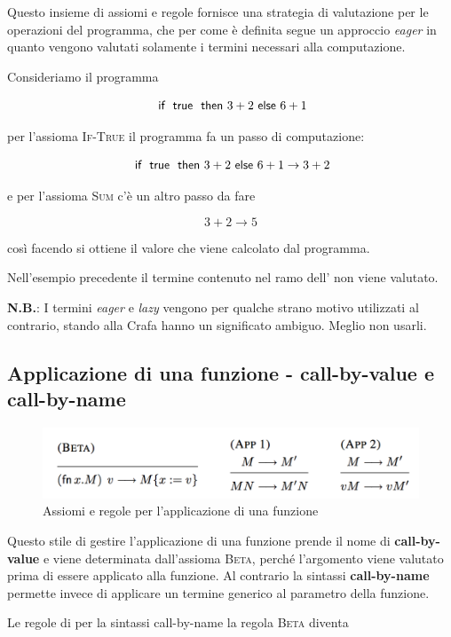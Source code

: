 Questo insieme di assiomi e regole fornisce una strategia di valutazione per le operazioni del programma, che per come è definita segue un approccio \textit{eager}  in quanto vengono valutati solamente i termini necessari alla computazione.

Consideriamo il programma 

$$
\iif \true \then 3+2 \eelse 6+1
$$

\noindent per l'assioma \textsc{If-True} il programma fa un passo di computazione:

$$
\iif \true \then 3+2 \eelse 6+1 \rightarrow 3+2
$$

\noindent e per l'assioma \textsc{Sum} c'è un altro passo da fare

$$
3+2 \rightarrow 5
$$

\noindent così facendo si ottiene il valore che viene calcolato dal programma.

Nell'esempio precedente il termine contenuto nel ramo  dell' non viene valutato.

\textbf{N.B.}: I termini \textit{eager} e \textit{lazy} vengono per qualche strano motivo utilizzati al contrario, stando alla Crafa hanno un significato ambiguo. Meglio non usarli.

\subsection{Applicazione di una funzione - call-by-value e call-by-name}

\begin{figure}[htpb]
	\centering
	\includegraphics[width = 0.7\linewidth]{./images/l3-assiomi-2}
	\caption{Assiomi e regole per l'applicazione di una funzione}
\end{figure}

\noindent Questo stile di gestire l'applicazione di una funzione prende il nome di \textbf{call-by-value} e viene determinata dall'assioma \textsc{Beta}, perché l'argomento viene valutato prima di essere applicato alla funzione.
Al contrario la sintassi \textbf{call-by-name} permette invece di applicare un termine generico al parametro della funzione.

Le regole di per la sintassi call-by-name la regola \textsc{Beta} diventa

